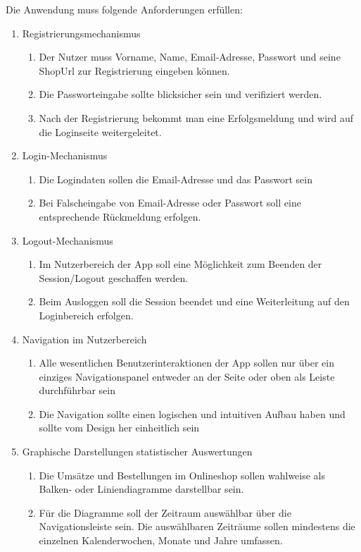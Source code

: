 Die Anwendung muss folgende Anforderungen erfüllen:
\begin{enumerate}
\item Registrierungsmechanismus
\begin{enumerate}
\item Der Nutzer muss Vorname, Name, Email-Adresse, Passwort und seine ShopUrl zur Registrierung eingeben können.
\item Die Passworteingabe sollte blicksicher sein und verifiziert werden.
\item Nach der Registrierung bekommt man eine Erfolgsmeldung und wird auf die Loginseite weitergeleitet.
\end{enumerate}
\item Login-Mechanismus
\begin{enumerate}
\item Die Logindaten sollen die Email-Adresse und das Passwort sein
\item Bei Falscheingabe von Email-Adresse oder Passwort soll eine entsprechende Rückmeldung erfolgen.
\end{enumerate}
\item Logout-Mechanismus
\begin{enumerate}
\item Im Nutzerbereich der App soll eine Möglichkeit zum Beenden der Session/Logout geschaffen werden.
\item Beim Ausloggen soll die Session beendet und eine Weiterleitung auf den Loginbereich erfolgen.
\end{enumerate}
\item Navigation im Nutzerbereich
\begin{enumerate}
\item Alle wesentlichen Benutzerinteraktionen der App sollen nur über ein einziges Navigationspanel entweder an der Seite oder oben als Leiste durchführbar sein
\item Die Navigation sollte einen logischen und intuitiven Aufbau haben und sollte vom Design her einheitlich sein
\end{enumerate}
\item Graphische Darstellungen statistischer Auswertungen
\begin{enumerate}
\item Die Umsätze und Bestellungen im Onlineshop sollen wahlweise als Balken- oder Liniendiagramme darstellbar sein.
\item Für die Diagramme soll der Zeitraum auswählbar über die Navigationsleiste sein. Die auswählbaren Zeiträume sollen mindestens die einzelnen Kalenderwochen, Monate und Jahre umfassen.

\end{enumerate}
\end{enumerate}
